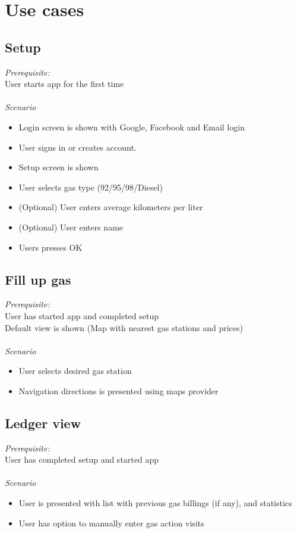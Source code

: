 
\chapter{Use cases}

\section{Setup}
\emph{Prerequisite:}\\
User starts app for the first time\\
\\
\emph{Scenario}
\begin{itemize}
	\item Login screen is shown with Google, Facebook and Email login
	\item User signs in or creates account.
	\item Setup screen is shown
	\item User selects gas type (92/95/98/Diesel)
	\item (Optional) User enters average kilometers per liter
	\item (Optional) User enters name
	\item Users presses OK
\end{itemize}

\section{Fill up gas}
\emph{Prerequisite:}\\
User has started app and completed setup\\
Default view is shown (Map with nearest gas stations and prices)\\
\\
\emph{Scenario}
\begin{itemize}
\item User selects desired gas station
\item Navigation  directions is presented using maps provider
\end{itemize}

\section{Ledger view}
\emph{Prerequisite:}\\
User has completed setup and started app\\
\\
\emph{Scenario}
\begin{itemize}
	\item User is presented with list with previous gas billings (if any), and statistics
	\item User has option to manually enter gas action visits
\end{itemize}

